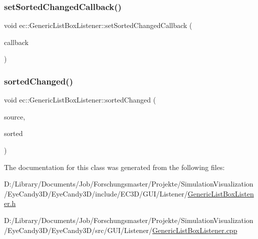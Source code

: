 \mbox{\label{classec_1_1_generic_list_box_listener_adbce2672e6173f9f2b09d6ba9df09828}} 
\subsubsection{\texorpdfstring{set\+Sorted\+Changed\+Callback()}{setSortedChangedCallback()}}
{\footnotesize\ttfamily void ec\+::\+Generic\+List\+Box\+Listener\+::set\+Sorted\+Changed\+Callback (\begin{DoxyParamCaption}\item[{const \mbox{\hyperlink{classec_1_1_generic_list_box_listener_a42ecf66ec6c32bbe9fe0174b2b1a527f}{Sorted\+Changed\+\_\+\+Callback}} \&}]{callback }\end{DoxyParamCaption})}

\mbox{\label{classec_1_1_generic_list_box_listener_a52b32a361ac45c09f0a3ada6e52334d6}} 
\subsubsection{\texorpdfstring{sorted\+Changed()}{sortedChanged()}}
{\footnotesize\ttfamily void ec\+::\+Generic\+List\+Box\+Listener\+::sorted\+Changed (\begin{DoxyParamCaption}\item[{agui\+::\+List\+Box $\ast$}]{source,  }\item[{bool}]{sorted }\end{DoxyParamCaption})\hspace{0.3cm}{\ttfamily [override]}}



The documentation for this class was generated from the following files\+:\begin{DoxyCompactItemize}
\item 
D\+:/\+Library/\+Documents/\+Job/\+Forschungsmaster/\+Projekte/\+Simulation\+Visualization/\+Eye\+Candy3\+D/\+Eye\+Candy3\+D/include/\+E\+C3\+D/\+G\+U\+I/\+Listener/\mbox{\hyperlink{_generic_list_box_listener_8h}{Generic\+List\+Box\+Listener.\+h}}\item 
D\+:/\+Library/\+Documents/\+Job/\+Forschungsmaster/\+Projekte/\+Simulation\+Visualization/\+Eye\+Candy3\+D/\+Eye\+Candy3\+D/src/\+G\+U\+I/\+Listener/\mbox{\hyperlink{_generic_list_box_listener_8cpp}{Generic\+List\+Box\+Listener.\+cpp}}\end{DoxyCompactItemize}
